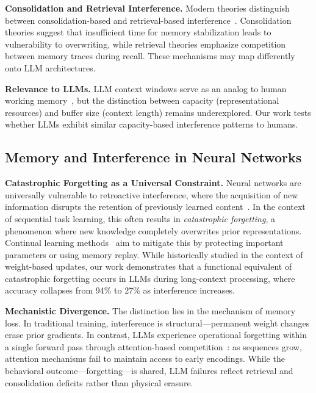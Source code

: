 \documentclass{article}
\begin{document}
\textbf{Consolidation and Retrieval Interference.} Modern theories distinguish between consolidation-based and retrieval-based interference~\citep{wixted2004consolidation}. Consolidation theories suggest that insufficient time for memory stabilization leads to vulnerability to overwriting, while retrieval theories emphasize competition between memory traces during recall. These mechanisms may map differently onto LLM architectures.

\textbf{Relevance to LLMs.} LLM context windows serve as an analog to human working memory~\citep{liu2024unable}, but the distinction between capacity (representational resources) and buffer size (context length) remains underexplored. Our work tests whether LLMs exhibit similar capacity-based interference patterns to humans.

\subsection{Memory and Interference in Neural Networks}

\textbf{Catastrophic Forgetting as a Universal Constraint.} Neural networks are universally vulnerable to retroactive interference, where the acquisition of new information disrupts the retention of previously learned content~\citep{mccloskey1989catastrophic, french1999catastrophic}. In the context of sequential task learning, this often results in \textit{catastrophic forgetting}, a phenomenon where new knowledge completely overwrites prior representations. Continual learning methods~\citep{kirkpatrick2017overcoming, zenke2017continual} aim to mitigate this by protecting important parameters or using memory replay. While historically studied in the context of weight-based updates, our work demonstrates that a functional equivalent of catastrophic forgetting occurs in LLMs during long-context processing, where accuracy collapses from 94\% to 27\% as interference increases.

\textbf{Mechanistic Divergence.} The distinction lies in the mechanism of memory loss. In traditional training, interference is structural---permanent weight changes erase prior gradients. In contrast, LLMs experience operational forgetting within a single forward pass through attention-based competition~\citep{brown2020gpt3}: as sequences grow, attention mechanisms fail to maintain access to early encodings. While the behavioral outcome---forgetting---is shared, LLM failures reflect retrieval and consolidation deficits rather than physical erasure.
\end{document}
